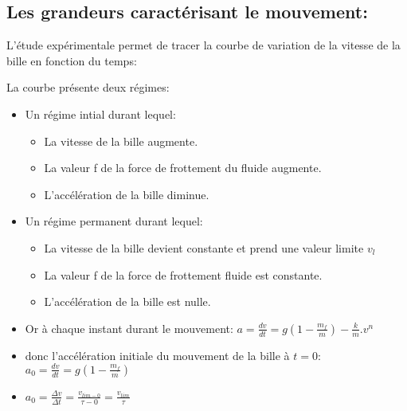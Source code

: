 \documentclass[12pt]{article}
\begin{document}
\subsection{Les grandeurs caractérisant le mouvement:}
L'étude expérimentale permet de tracer la courbe de variation de la vitesse de la bille en fonction du temps:
\begin{center}

\end{center}	
La courbe présente deux régimes:
\begin{itemize}
\item Un régime intial durant lequel:
	\begin{itemize}
		\item La vitesse de la bille augmente.
		\item  La valeur f de la force de frottement du fluide augmente.
		\item  L'accélération de la bille diminue.
	\end{itemize}
\item  Un régime permanent durant lequel:
	\begin{itemize}
		\item La vitesse de la bille devient constante et prend une valeur limite $v_l$
		\item La valeur f de la force de frottement fluide est constante.
		\item L'accélération de la bille est nulle.
	\end{itemize}

\item Or à chaque instant durant le mouvement: $a = \frac{dv}{dt} = g(1 - \frac{m_f}{m}) - \frac{k}{m}.v^n$ 
\item donc l'accélération initiale du mouvement de la bille à $t=0$:  $a_0 = \frac{dv}{dt} = g(1 - \frac{m_f}{m})$
\item $a_0 = \frac{\Delta{v}}{\Delta{t}} = \frac{v_{lim - 0}}{\tau - 0} = \frac{v_{lim}}{\tau}$
\end{itemize}
\end{document}
